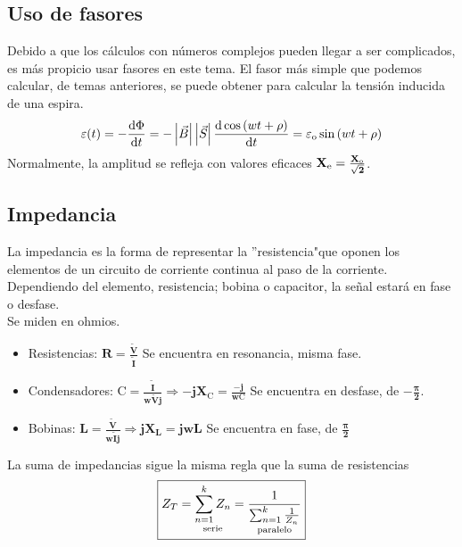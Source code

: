 \subsection{Uso de fasores}
\noindent Debido a que los cálculos con números complejos pueden llegar a ser complicados, es más propicio usar fasores en este tema. El fasor más simple que podemos calcular, de temas anteriores, se puede obtener para calcular la tensión inducida de una espira.
\[
        \varepsilon (t) = -\frac{\mathrm{d} \Phi}{\mathrm{d} t} = -\left | \vec{B} \right |\left | \vec{S} \right |\frac{\mathrm{d} \cos{(wt+\rho )}}{\mathrm{d} t} = \varepsilon_{\textnormal{o}}\sin{(wt + \rho)}
\]
\noindent Normalmente, la amplitud se refleja con valores eficaces \(\mathbf{X_{\textnormal{e}} = \frac{X_{\textnormal{o}}}{\sqrt{2}}}\).
\subsection{Impedancia}
\noindent La impedancia es la forma de representar la ''resistencia"\space que oponen los elementos de un circuito de corriente continua al paso de la corriente.\\
Dependiendo del elemento, resistencia; bobina o capacitor, la señal estará en fase o desfase.\\ Se miden en ohmios.
\begin{itemize}
        \item Resistencias:
              \(\boxed{\mathbf{R = \frac{\tilde{V}}{\tilde{I}}}}\) Se encuentra en resonancia, misma fase.
        \item Condensadores:
              \(\boxed{\mathbf{\mathrm{C} = \frac{\tilde{I}}{w\tilde{V}j} \Rightarrow -jX_{\mathrm{C}} = \frac{-j}{w\mathrm{C}}}}\) Se encuentra en desfase, de \(\mathbf{-\frac{\pi}{2}}\).
        \item Bobinas:
              \(\boxed{\mathbf{L = \frac{\tilde{V}}{w\tilde{I}j} \Rightarrow jX_L =jwL}}\) Se encuentra en fase, de \(\mathbf{\frac{\pi}{2}}\)
\end{itemize}
La suma de impedancias sigue la misma regla que la suma de resistencias \[
        \boxed{Z_T = \underset{\textnormal{serie}}{\sum_{n=1}^{k} Z_n} = \underset{\textnormal{paralelo}}{\frac{1}{\sum_{n=1}^{k}\frac{1}{Z_n}}}}
\]
